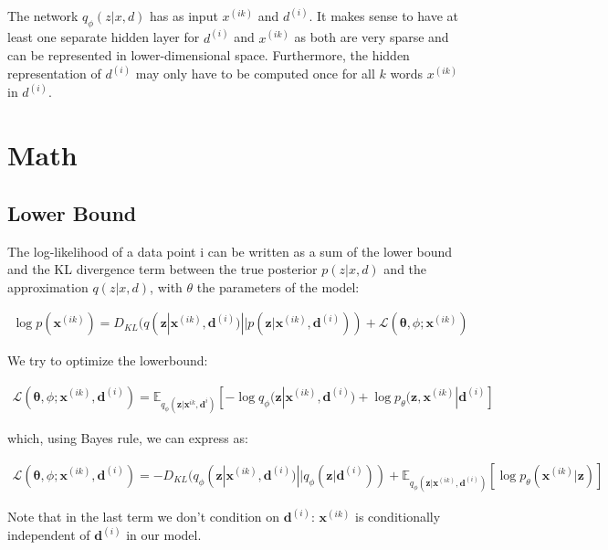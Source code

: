 \documentclass{article}
\begin{document}
The network $q_\phi(z|x,d)$ has as input $x^{(ik)}$ and $d^{(i)}$. It makes sense to have at least one separate hidden layer for $d^{(i)}$ and $x^{(ik)}$ as both are very sparse and can be represented in lower-dimensional space. Furthermore, the hidden representation of $d^{(i)}$ may only have to be computed once for all $k$ words $x^{(ik)}$ in $d^{(i)}$.

\section{Math}

\subsection{Lower Bound}

The log-likelihood of a data point i can be written as a sum of the lower bound and the KL divergence term between the true posterior $p(z|x,d)$ and the approximation $q(z|x,d)$, with $\theta$ the parameters of the model:

\begin{align*}
    \log p(\mathbf{x}^{(ik)}) = D_{KL}(q(\mathbf{z}|\mathbf{x}^{(ik)},\mathbf{d}^{(i)}) || p(\mathbf{z}|\mathbf{x}^{(ik)},\mathbf{d}^{(i)})) + \mathcal{L}(\mathbf{\theta}, \phi; \mathbf{x}^{(ik)})
\end{align*}

We try to optimize the lowerbound: 

\begin{align}
\mathcal{L}(\mathbf{\theta}, \phi; \mathbf{x}^{(ik)}, \mathbf{d}^{(i)}) = \mathds{E}_{q_\phi(\mathbf{z}|\mathbf{x}^{ik},\mathbf{d}^{i})}[-\log q_\phi (\mathbf{z}| \mathbf{x}^{(ik)}, \mathbf{d}^{(i)})+\log p_\theta(\mathbf{z}, \mathbf{x}^{(ik)}|\mathbf{d}^{(i)} ]
\end{align}

which, using Bayes rule, we can express as:

\begin{align}
\mathcal{L}(\mathbf{\theta}, \phi; \mathbf{x}^{(ik)}, \mathbf{d}^{(i)}) = -D_{KL}(q_\phi (\mathbf{z}| \mathbf{x}^{(ik)}, \mathbf{d}^{(i)})||q_\phi (\mathbf{z}| \mathbf{d}^{(i)})) + \mathds{E}_{q_\phi(\mathbf{z}|\mathbf{x}^{(ik)},\mathbf{d}^{(i)})}[\log p_\theta (\mathbf{x}^{(ik)}|\mathbf{z})]
\end{align}

Note that in the last term we don't condition on $\mathbf{d}^{(i)}$: $\mathbf{x}^{(ik)}$ is conditionally independent of $\mathbf{d}^{(i)}$ in our model.
\end{document}
